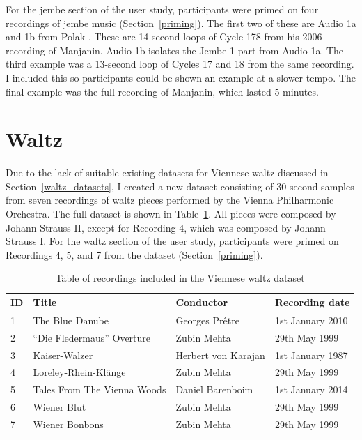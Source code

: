 \documentclass[12pt,twoside,openright]{report}
\begin{document}
For the jembe section of the user study, participants were primed on four recordings of jembe music (Section~\ref{priming}). The first two of these are Audio 1a and 1b from Polak \cite{polak2010}. These are 14-second loops of Cycle 178 from his 2006 recording of Manjanin. Audio 1b isolates the Jembe 1 part from Audio 1a. The third example was a 13-second loop of Cycles 17 and 18 from the same recording. I included this so participants could be shown an example at a slower tempo. The final example was the full recording of Manjanin, which lasted 5 minutes.



\section*{Waltz} \label{appendix_datasets_waltz}

Due to the lack of suitable existing datasets for Viennese waltz discussed in Section~\ref{waltz_datasets}, I created a new dataset consisting of 30-second samples from seven recordings of waltz pieces performed by the Vienna Philharmonic Orchestra. The full dataset is shown in Table~\ref{table:waltz_dataset}. All pieces were composed by Johann Strauss II, except for Recording 4, which was composed by Johann Strauss I. For the waltz section of the user study, participants were primed on Recordings 4, 5, and 7 from the dataset (Section~\ref{priming}). 

\begin{table}[ht]
    \begin{tabularx}{\linewidth}{
        l
        >{\raggedright\arraybackslash}X
        l
        l
    }
        \toprule
        ID & Title & Conductor & Recording date \\
        \midrule
        1 & The Blue Danube & Georges Prêtre & 1st January 2010 \\
        2 & ``Die Fledermaus'' Overture & Zubin Mehta & 29th May 1999 \\
        3 & Kaiser-Walzer & Herbert von Karajan & 1st January 1987 \\
        4 & Loreley-Rhein-Klänge & Zubin Mehta & 29th May 1999 \\
        5 & Tales From The Vienna Woods & Daniel Barenboim & 1st January 2014 \\
        6 & Wiener Blut & Zubin Mehta & 29th May 1999 \\
        7 & Wiener Bonbons & Zubin Mehta & 29th May 1999 \\
        \bottomrule
    \end{tabularx}
    \caption{Table of recordings included in the Viennese waltz dataset}
    \label{table:waltz_dataset}
\end{table}
\end{document}
